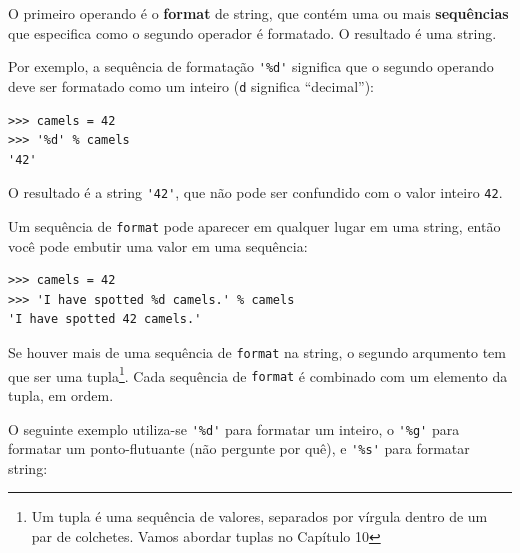 {O primeiro operando é o {\bf format} de string, que contém uma ou mais
{\bf sequências} que especifica como o segundo operador é formatado. O
resultado é uma string.



Por exemplo, a sequência de formatação \verb"'%d'" significa que o segundo
operando deve ser formatado como um inteiro ({\tt d} significa ``decimal''):

\beforeverb
\begin{verbatim}
>>> camels = 42
>>> '%d' % camels
'42'
\end{verbatim}
\afterverb
%
%
O resultado é a string \verb"'42'", que não pode ser confundido com o valor
inteiro {\tt 42}.


Um sequência de {\tt format} pode aparecer em qualquer lugar em uma string,
então você pode embutir uma valor em uma sequência:

\beforeverb
\begin{verbatim}
>>> camels = 42
>>> 'I have spotted %d camels.' % camels
'I have spotted 42 camels.'
\end{verbatim}
\afterverb
%
%
Se houver mais de uma sequência de {\tt format} na string, o segundo arqumento
tem que ser uma tupla\footnote{Um tupla é uma sequência de valores, separados
	por vírgula dentro de um par de colchetes. Vamos abordar tuplas no
	Capítulo 10}. Cada sequência de {\tt format} é combinado com um elemento
da tupla, em ordem.


O seguinte exemplo utiliza-se \verb"'%d'" para formatar um inteiro, o
\verb"'%g'" para formatar um ponto-flutuante (não pergunte por quê), e
\verb"'%s'" para formatar string:

}

